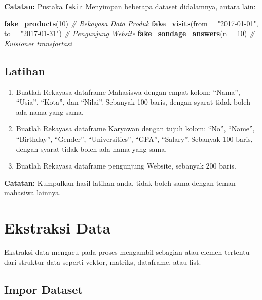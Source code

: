 \documentclass[
]{book}
\newenvironment{Shaded}{\begin{snugshade}}{\end{snugshade}}
\newcommand{\AttributeTok}[1]{\textcolor[rgb]{0.13,0.29,0.53}{#1}}
\newcommand{\CommentTok}[1]{\textcolor[rgb]{0.56,0.35,0.01}{\textit{#1}}}
\newcommand{\DecValTok}[1]{\textcolor[rgb]{0.00,0.00,0.81}{#1}}
\newcommand{\FunctionTok}[1]{\textcolor[rgb]{0.13,0.29,0.53}{\textbf{#1}}}
\newcommand{\NormalTok}[1]{#1}
\newcommand{\StringTok}[1]{\textcolor[rgb]{0.31,0.60,0.02}{#1}}
\begin{document}
\textbf{Catatan:} Pustaka \texttt{fakir} Menyimpan beberapa dataset didalamnya, antara lain:

\begin{Shaded}
\begin{Highlighting}[]
\FunctionTok{fake\_products}\NormalTok{(}\DecValTok{10}\NormalTok{)                                   }\CommentTok{\# Rekayasa Data Produk }
\FunctionTok{fake\_visits}\NormalTok{(}\AttributeTok{from =} \StringTok{"2017{-}01{-}01"}\NormalTok{, }\AttributeTok{to =} \StringTok{"2017{-}01{-}31"}\NormalTok{) }\CommentTok{\# Pengunjung Website}
\FunctionTok{fake\_sondage\_answers}\NormalTok{(}\AttributeTok{n =} \DecValTok{10}\NormalTok{)                        }\CommentTok{\# Kuisioner transfortasi}
\end{Highlighting}
\end{Shaded}

\hypertarget{latihan-1}{%
\section{Latihan}\label{latihan-1}}

\begin{enumerate}
\def\labelenumi{\arabic{enumi}.}
\item
  Buatlah Rekayasa dataframe Mahasiswa dengan empat kolom: ``Nama'', ``Usia'', ``Kota'', dan ``Nilai''. Sebanyak 100 baris, dengan syarat tidak boleh ada nama yang sama.
\item
  Buatlah Rekayasa dataframe Karyawan dengan tujuh kolom: ``No'', ``Name'', ``Birthday'', ``Gender'', ``Universities'', ``GPA'', ``Salary''. Sebanyak 100 baris, dengan syarat tidak boleh ada nama yang sama.
\item
  Buatlah Rekayasa dataframe pengunjung Website, sebanyak 200 baris.
\end{enumerate}

\textbf{Catatan:} Kumpulkan hasil latihan anda, tidak boleh sama dengan teman mahasiwa lainnya.

\hypertarget{ekstraksi-data}{%
\chapter{Ekstraksi Data}\label{ekstraksi-data}}

Ekstraksi data mengacu pada proses mengambil sebagian atau elemen tertentu dari struktur data seperti vektor, matriks, dataframe, atau list.

\hypertarget{impor-dataset}{%
\section{Impor Dataset}\label{impor-dataset}}
\end{document}
